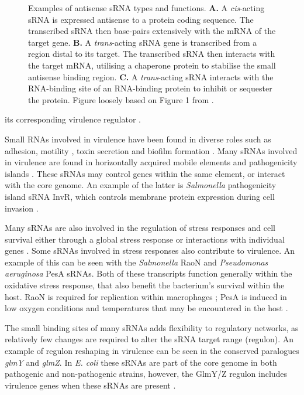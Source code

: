 \begin{figure}
  \centering
  \caption[Examples of antisense sRNA types and functions]{Examples of antisense sRNA types and functions. \textbf{A.} A \textit{cis}-acting sRNA is expressed antisense to a protein coding sequence. The transcribed sRNA then base-pairs extensively with the mRNA of the target gene. \textbf{B.} A \textit{trans}-acting sRNA gene is transcribed from a region distal to its target. The transcribed sRNA then interacts with the target mRNA, utilising a chaperone protein to stabilise the small antisense binding region. \textbf{C.} A \textit{trans}-acting sRNA interacts with the RNA-binding site of an RNA-binding protein to inhibit or sequester the protein. Figure loosely based on Figure 1 from \cite{Pernitzsch2012-xo}.}
  \label{fig:sRNA_cis_trans}
\end{figure} its corresponding virulence regulator \citep{Gong2011-vs}.\par
Small RNAs involved in virulence have been found in diverse roles such as adhesion, motility \citep{Vannini2016-mn}, toxin secretion and biofilm formation \citep{Bradley2011-rh}. Many sRNAs involved in virulence are found in horizontally acquired mobile elements and pathogenicity islands \citep{Papenfort2010-cj}.
These sRNAs may control genes within the same element, or interact with the core genome. An example of the latter is \textit{Salmonella} pathogenicity island sRNA InvR, which controls membrane protein expression during cell invasion \citep{Pfeiffer2007-yb}. \par

Many sRNAs are also involved in the regulation of stress responses and cell survival either through a global stress response or interactions with individual genes \citep{Bhatt2016-dk,Hoe2013-kh}. Some sRNAs involved in stress responses also contribute to virulence. An example of this can be seen with the \textit{Salmonella} RaoN and \textit{Pseudomonas aeruginosa} PesA sRNAs. Both of these transcripts function generally within the oxidative stress response, that also benefit the bacterium’s survival within the host. RaoN is required for replication within macrophages  \citep{Lee2013-un}; PesA is induced in low oxygen conditions and temperatures that may be encountered in the host \citep{Ferrara2017-su}.\par

The small binding sites of many sRNAs adds flexibility to regulatory networks, as relatively few changes are required to alter the sRNA target range (regulon). An example of regulon reshaping in virulence can be seen in the conserved paralogues \textit{glmY} and \textit{glmZ}. In \textit{E. coli} these sRNAs are part of the core genome in both pathogenic and non-pathogenic strains, however, the GlmY/Z regulon includes virulence genes when these sRNAs are present \citep{Bhatt2016-dk,Gruber2015-rb}. \par

